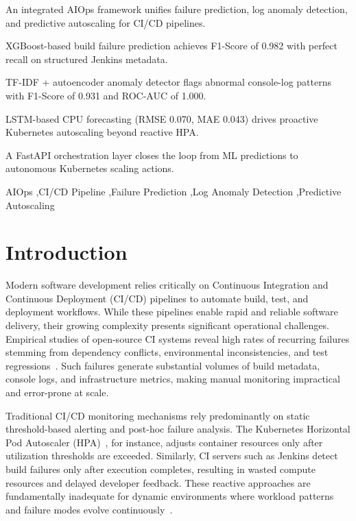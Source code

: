 \documentclass[a4paper,fleqn]{cas-dc}
\begin{document}
\begin{highlights}
\item An integrated AIOps framework unifies failure prediction, log anomaly detection, and predictive autoscaling for CI/CD pipelines.
\item XGBoost-based build failure prediction achieves F1-Score of 0.982 with perfect recall on structured Jenkins metadata.
\item TF-IDF + autoencoder anomaly detector flags abnormal console-log patterns with F1-Score of 0.931 and ROC-AUC of 1.000.
\item LSTM-based CPU forecasting (RMSE 0.070, MAE 0.043) drives proactive Kubernetes autoscaling beyond reactive HPA.
\item A FastAPI orchestration layer closes the loop from ML predictions to autonomous Kubernetes scaling actions.
\end{highlights}


\begin{keywords}
AIOps \sep CI/CD Pipeline \sep Failure Prediction \sep Log Anomaly Detection \sep Predictive Autoscaling
\end{keywords}

\maketitle

\section{Introduction}\label{sec:introduction}

Modern software development relies critically on Continuous Integration and Continuous Deployment (CI/CD) pipelines to automate build, test, and deployment workflows.
While these pipelines enable rapid and reliable software delivery, their growing complexity presents significant operational challenges.
Empirical studies of open-source CI systems reveal high rates of recurring failures stemming from dependency conflicts, environmental inconsistencies, and test regressions~\citep{rausch2017empirical, beller2017oops}.
Such failures generate substantial volumes of build metadata, console logs, and infrastructure metrics, making manual monitoring impractical and error-prone at scale.

Traditional CI/CD monitoring mechanisms rely predominantly on static threshold-based alerting and post-hoc failure analysis.
The Kubernetes Horizontal Pod Autoscaler (HPA)~\citep{kubernetesDocs}, for instance, adjusts container resources only after utilization thresholds are exceeded.
Similarly, CI servers such as Jenkins detect build failures only after execution completes, resulting in wasted compute resources and delayed developer feedback.
These reactive approaches are fundamentally inadequate for dynamic environments where workload patterns and failure modes evolve continuously~\citep{kanahols2025timeseries}.
\end{document}

